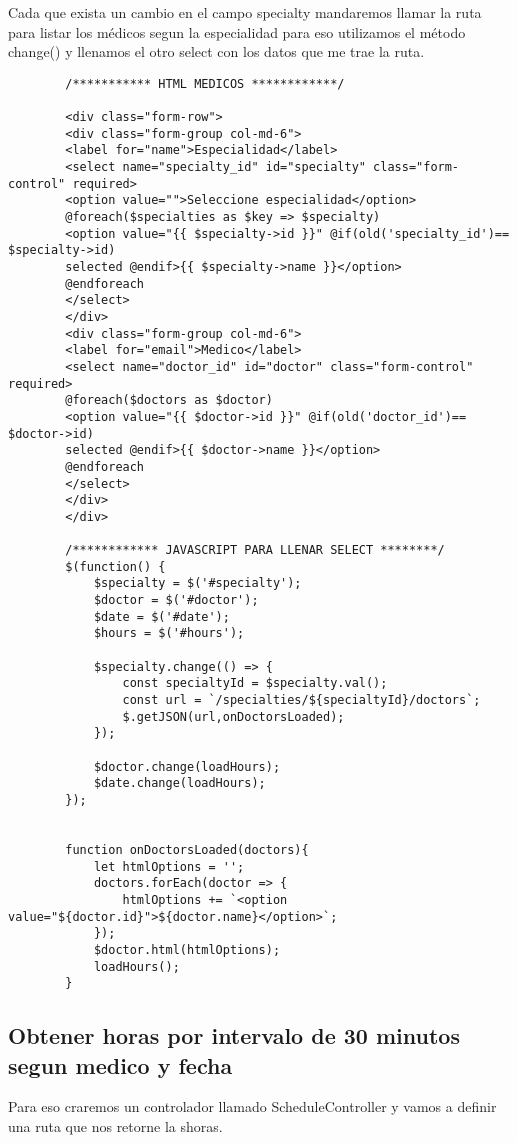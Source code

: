 \documentclass[a4paper]{article}
\begin{document}
	Cada que exista un cambio en el campo specialty mandaremos llamar la ruta para listar los médicos segun la especialidad para eso utilizamos el método change() y llenamos el otro select con los datos que me trae la ruta.
	
	\begin{lstlisting}
		/*********** HTML MEDICOS ************/
		
		<div class="form-row">
		<div class="form-group col-md-6">
		<label for="name">Especialidad</label>
		<select name="specialty_id" id="specialty" class="form-control" required>
		<option value="">Seleccione especialidad</option>
		@foreach($specialties as $key => $specialty)
		<option value="{{ $specialty->id }}" @if(old('specialty_id')== $specialty->id)
		selected @endif>{{ $specialty->name }}</option>
		@endforeach
		</select>
		</div>
		<div class="form-group col-md-6">
		<label for="email">Medico</label>
		<select name="doctor_id" id="doctor" class="form-control" required>
		@foreach($doctors as $doctor)
		<option value="{{ $doctor->id }}" @if(old('doctor_id')== $doctor->id)
		selected @endif>{{ $doctor->name }}</option>
		@endforeach
		</select>
		</div>
		</div>
		
		/************ JAVASCRIPT PARA LLENAR SELECT ********/
		$(function() {
			$specialty = $('#specialty');
			$doctor = $('#doctor');
			$date = $('#date');
			$hours = $('#hours');
			
			$specialty.change(() => {
				const specialtyId = $specialty.val();
				const url = `/specialties/${specialtyId}/doctors`;
				$.getJSON(url,onDoctorsLoaded);
			});
			
			$doctor.change(loadHours);
			$date.change(loadHours);
		});
	
		
		function onDoctorsLoaded(doctors){
			let htmlOptions = '';
			doctors.forEach(doctor => {
				htmlOptions += `<option value="${doctor.id}">${doctor.name}</option>`;
			});
			$doctor.html(htmlOptions);
			loadHours();
		}
	\end{lstlisting}
	
	\subsection{Obtener horas por intervalo de 30 minutos segun medico y fecha}
	
	Para eso craremos un controlador llamado ScheduleController y vamos a definir una ruta que nos retorne la shoras.
	
\end{document}
